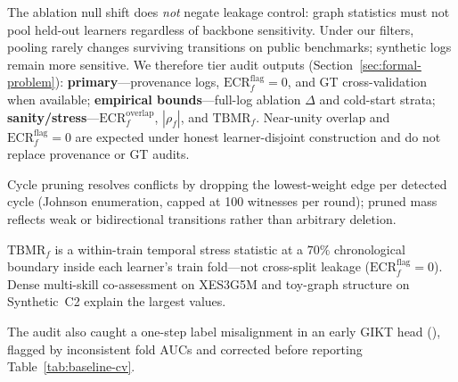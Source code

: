 \documentclass[pdflatex,sn-mathphys-num]{sn-jnl}
\begin{document}
The ablation null shift does \emph{not} negate leakage control: graph
statistics must not pool held-out learners regardless of backbone
sensitivity. Under our filters, pooling rarely changes surviving transitions on
public benchmarks; synthetic logs remain more sensitive. We therefore tier audit
outputs (Section~\ref{sec:formal-problem}): \textbf{primary}---provenance logs,
$\mathrm{ECR}^{\mathrm{flag}}_f{=}0$, and GT cross-validation when available;
\textbf{empirical bounds}---full-log ablation $\Delta$ and cold-start strata;
\textbf{sanity/stress}---$\mathrm{ECR}^{\mathrm{overlap}}_f$, $|\rho_f|$, and
$\mathrm{TBMR}_f$. Near-unity overlap and $\mathrm{ECR}^{\mathrm{flag}}_f{=}0$
are expected under honest learner-disjoint construction and do not replace
provenance or GT audits.

Cycle pruning resolves conflicts by dropping the lowest-weight edge per detected
cycle (Johnson enumeration, capped at 100 witnesses per round); pruned mass
reflects weak or bidirectional transitions rather than arbitrary deletion.

$\mathrm{TBMR}_f$ is a within-train temporal stress statistic at a $70\%$
chronological boundary inside each learner's train fold---not cross-split
leakage ($\mathrm{ECR}^{\mathrm{flag}}_f{=}0$). Dense multi-skill
co-assessment on XES3G5M and toy-graph structure on Synthetic~C2 explain the
largest values.

The audit also caught a one-step label misalignment in an early GIKT head
(), flagged by inconsistent fold AUCs and corrected
before reporting Table~\ref{tab:baseline-cv}.
\end{document}
